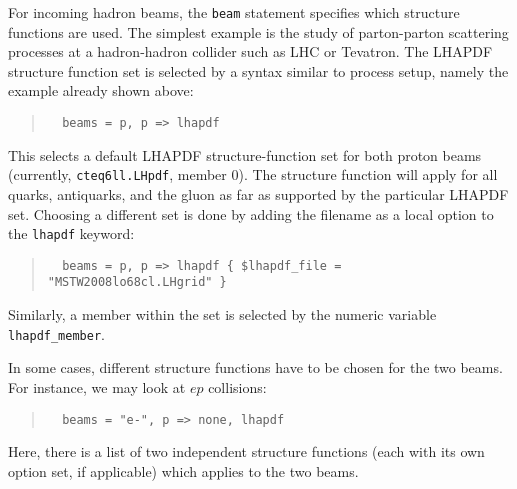 \documentclass[12pt]{book}
\newcommand{\ttt}[1]{\texttt{#1}}
\begin{document}
For incoming hadron beams, the \ttt{beam} statement specifies which structure
functions are used.  The simplest example is the study of parton-parton
scattering processes at a hadron-hadron collider such as LHC or Tevatron.  The
LHAPDF structure function set is selected by a syntax similar to process
setup, namely the example already shown above:
\begin{quote}
\begin{footnotesize}
\begin{verbatim}
  beams = p, p => lhapdf
\end{verbatim}
\end{footnotesize}
\end{quote}
This selects a default LHAPDF structure-function set for both proton beams
(currently, \ttt{cteq6ll.LHpdf}, member 0).  The structure function will apply
for all quarks, antiquarks, and the gluon as far as supported by the
particular LHAPDF set.  Choosing a different set is done by adding the
filename as a local option to the \ttt{lhapdf} keyword:
\begin{quote}
\begin{footnotesize}
\begin{verbatim}
  beams = p, p => lhapdf { $lhapdf_file = "MSTW2008lo68cl.LHgrid" }
\end{verbatim}
\end{footnotesize}
\end{quote}
Similarly, a member within the set is selected by the numeric variable
\verb|lhapdf_member|.

In some cases, different structure functions have to be chosen for the two
beams.  For instance, we may look at $ep$ collisions:
\begin{quote}
\begin{footnotesize}
\begin{verbatim}
  beams = "e-", p => none, lhapdf
\end{verbatim}
\end{footnotesize}
\end{quote}
Here, there is a list of two independent structure functions (each with its
own option set, if applicable) which applies to the two beams.
\end{document}
